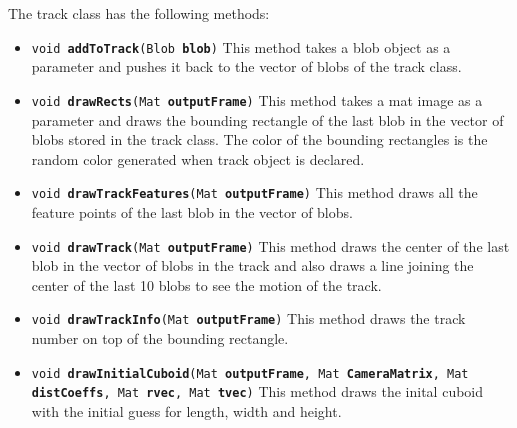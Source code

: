 \documentclass[a4paper]{aitthesis}
\begin{document}
The track class has the following methods:
\begin{itemize}
\item \texttt{void \textbf{addToTrack}(Blob \textbf{blob})} \newline
This method takes a blob object as a parameter and pushes it back to the vector of blobs of the track class.
\item \texttt{void \textbf{drawRects}(Mat \textbf{outputFrame})} \newline
This method takes a mat image as a parameter and draws the bounding rectangle of the last blob in the vector of blobs stored in the track class. The color of the bounding rectangles is the random color generated when track object is declared.
\item \texttt{void \textbf{drawTrackFeatures}(Mat \textbf{outputFrame})} \newline 
This method draws all the feature points of the last blob in the vector of blobs.
\item \texttt{void \textbf{drawTrack}(Mat \textbf{outputFrame})} \newline
This method draws the center of the last blob in the vector of blobs in the track and also draws a line joining the center of the last 10 blobs to see the motion of the track.
\item \texttt{void \textbf{drawTrackInfo}(Mat \textbf{outputFrame})} \newline 
This method draws the track number on top of the bounding rectangle.
\item \texttt{void \textbf{drawInitialCuboid}(Mat \textbf{outputFrame}, Mat \textbf{CameraMatrix}, \newline Mat \textbf{distCoeffs}, Mat \textbf{rvec}, Mat \textbf{tvec})} \newline
This method draws the inital cuboid with the initial guess for length, width and height.
\end{itemize}
\end{document}
